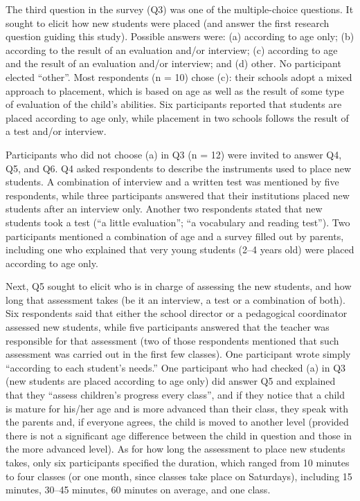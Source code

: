 \documentclass[output=paper]{langscibook}
\begin{document}
The third question in the survey (Q3) was one of the multiple-choice questions. It sought to elicit how new students were placed (and answer the first research question guiding this study). Possible answers were: (a) according to age only; (b) according to the result of an evaluation and/or interview; (c) according to age and the result of an evaluation and/or interview; and (d) other. No participant elected “other”. Most respondents (n = 10) chose (c): their schools adopt a mixed approach to placement, which is based on age as well as the result of some type of evaluation of the child’s abilities. Six participants reported that students are placed according to age only, while placement in two schools follows the result of a test and/or interview.

Participants who did not choose (a) in Q3 (n = 12) were invited to answer Q4, Q5, and Q6. Q4 asked respondents to describe the instruments used to place new students. A combination of interview and a written test was mentioned by five respondents, while three participants answered that their institutions placed new students after an interview only. Another two respondents stated that new students took a test (“a little evaluation”; “a vocabulary and reading test”). Two participants mentioned a combination of age and a survey filled out by parents, including one who explained that very young students (2--4 years old) were placed according to age only.

Next, Q5 sought to elicit who is in charge of assessing the new students, and how long that assessment takes (be it an interview, a test or a combination of both). Six respondents said that either the school director or a pedagogical coordinator assessed new students, while five participants answered that the teacher was responsible for that assessment (two of those respondents mentioned that such assessment was carried out in the first few classes). One participant wrote simply “according to each student’s needs.” One participant who had checked (a) in Q3 (new students are placed according to age only) did answer Q5 and explained that they “assess children’s progress every class”, and if they notice that a child is mature for his/her age and is more advanced than their class, they speak with the parents and, if everyone agrees, the child is moved to another level (provided there is not a significant age difference between the child in question and those in the more advanced level). As for how long the assessment to place new students takes, only six participants specified the duration, which ranged from 10 minutes to four classes (or one month, since classes take place on Saturdays), including 15 minutes, 30--45 minutes, 60 minutes on average, and one class.
\end{document}
